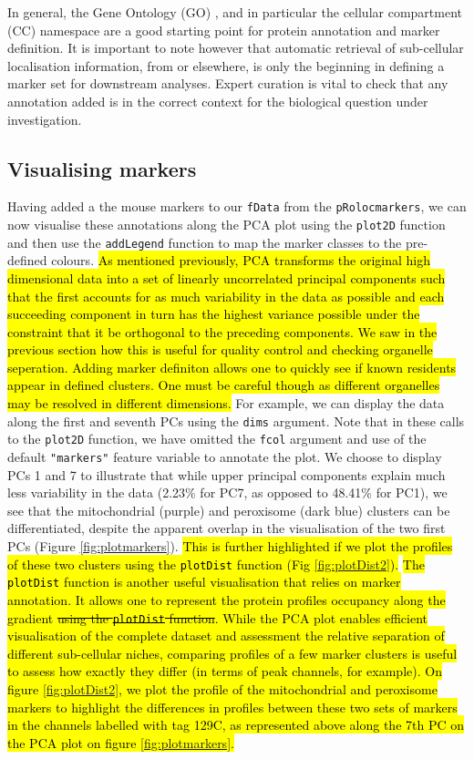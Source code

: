In general, the Gene Ontology (GO) \cite{Ashburner:2000}, and in
particular the cellular compartment (CC) namespace are a good starting
point for protein annotation and marker definition. It is important to
note however that automatic retrieval of sub-cellular localisation
information, from  or elsewhere, is only the
beginning in defining a marker set for downstream analyses. Expert
curation is vital to check that any annotation added is in the correct
context for the biological question under investigation.


\subsection*{Visualising markers}

Having added a the mouse markers to our \texttt{fData} from the
\texttt{pRolocmarkers}, we can now visualise these annotations along
the PCA plot using the \texttt{plot2D} function and then use the
\texttt{addLegend} function to map the marker classes to the
pre-defined colours. \hl{As mentioned previously, PCA transforms the
original high dimensional data into a set of linearly uncorrelated
principal components such that the first accounts for as much
variability in the data as possible and each succeeding component in
turn has the highest variance possible under the constraint that it
be orthogonal to the preceding components. We saw in the previous
section how this is useful for quality control and checking
organelle seperation.  Adding marker definiton allows one to quickly
see if known residents appear in defined clusters. One must be
careful though as different organelles may be resolved in different
dimensions.} For example, we can display the data along the first and
seventh PCs using the \texttt{dims} argument. Note that in these
calls to the \texttt{plot2D} function, we have omitted the
\texttt{fcol} argument and use of the default \texttt{"markers"}
feature variable to annotate the plot. We choose to display PCs 1
and 7 to illustrate that while upper principal components explain
much less variability in the data (2.23\% for PC7, as opposed to
48.41\% for PC1), we see that the mitochondrial (purple) and
peroxisome (dark blue) clusters can be differentiated, despite the
apparent overlap in the visualisation of the two first PCs (Figure
\ref{fig:plotmarkers}).  \hl{This is further highlighted if we plot the
profiles of these two clusters using the \texttt{plotDist} function
(Fig \ref{fig:plotDist2}).} \hl{The \texttt{plotDist} function is
another useful visualisation that relies on marker annotation. It
allows one to represent the protein profiles occupancy along the
gradient \sout{using the \texttt{plotDist} function}. While the PCA
plot enables efficient visualisation of the complete dataset and
assessment the relative separation of different sub-cellular niches,
comparing profiles of a few marker clusters is useful to assess how
exactly they differ (in terms of peak channels, for example). On
figure \ref{fig:plotDist2}, we plot the profile of the mitochondrial
and peroxisome markers to highlight the differences in profiles
between these two sets of markers in the channels labelled with tag
129C, as represented above along the 7th PC on the PCA plot on
figure \ref{fig:plotmarkers}.}


